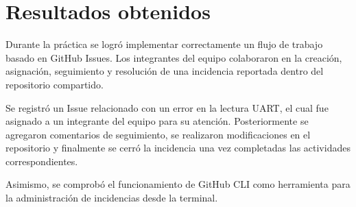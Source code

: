 \section{Resultados obtenidos}

Durante la práctica se logró implementar correctamente un flujo de trabajo basado en GitHub Issues. Los integrantes del equipo colaboraron en la creación, asignación, seguimiento y resolución de una incidencia reportada dentro del repositorio compartido.

Se registró un Issue relacionado con un error en la lectura UART, el cual fue asignado a un integrante del equipo para su atención. Posteriormente se agregaron comentarios de seguimiento, se realizaron modificaciones en el repositorio y finalmente se cerró la incidencia una vez completadas las actividades correspondientes.

Asimismo, se comprobó el funcionamiento de GitHub CLI como herramienta para la administración de incidencias desde la terminal.